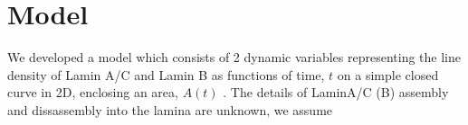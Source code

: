 \section{Model}
We developed a model which consists of 2 dynamic variables representing the line density of Lamin A/C and Lamin B as functions of time, $t$ on a simple closed curve in 2D, enclosing an area, $A(t)$ . The details of LaminA/C (B)  assembly and dissassembly into the lamina are unknown, we assume 